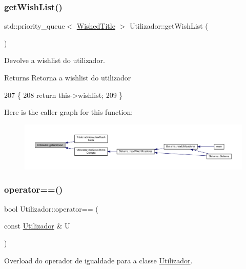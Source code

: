 \subsubsection{\texorpdfstring{get\+Wish\+List()}{getWishList()}}
{\footnotesize\ttfamily std\+::priority\+\_\+queue$<$ \hyperlink{classWishedTitle}{Wished\+Title} $>$ Utilizador\+::get\+Wish\+List (\begin{DoxyParamCaption}{ }\end{DoxyParamCaption})}



Devolve a wishlist do utilizador. 

\begin{DoxyReturn}{Returns}
Retorna a wishlist do utilizador 
\end{DoxyReturn}

\begin{DoxyCode}
207                                                        \{
208     \textcolor{keywordflow}{return} this->wishlist;
209 \}
\end{DoxyCode}
Here is the caller graph for this function\+:
\nopagebreak
\begin{figure}[H]
\begin{center}
\leavevmode
\includegraphics[width=350pt]{classUtilizador_a8624e9e45e13e592e68164b0d7b2b7cd_icgraph}
\end{center}
\end{figure}
\mbox{\label{classUtilizador_abd73f24d4eb5fa0838af819e8343b1f5}} 
\subsubsection{\texorpdfstring{operator==()}{operator==()}}
{\footnotesize\ttfamily bool Utilizador\+::operator== (\begin{DoxyParamCaption}\item[{const \hyperlink{classUtilizador}{Utilizador} \&}]{U }\end{DoxyParamCaption})}



Overload do operador de igualdade para a classe \hyperlink{classUtilizador}{Utilizador}. 


